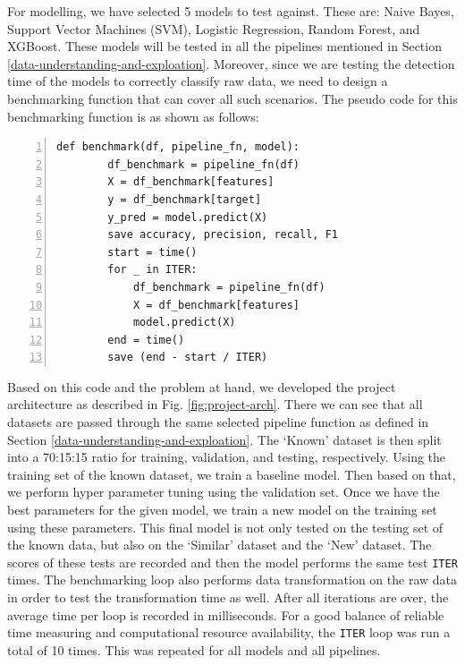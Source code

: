 For modelling, we have selected 5 models to test against. These are: Naive Bayes, Support Vector Machines (SVM), Logistic Regression, Random Forest, and XGBoost. These models will be tested in all the pipelines mentioned in Section \ref{data-understanding-and-exploation}. Moreover, since we are testing the detection time of the models to correctly classify raw data, we need to design a benchmarking function that can cover all such scenarios. The pseudo code for this benchmarking function is as shown as follows:

\begin{lstlisting}[numbers=left,numbersep=-2em,frame=lines]
    def benchmark(df, pipeline_fn, model):
        df_benchmark = pipeline_fn(df)
        X = df_benchmark[features]
        y = df_benchmark[target]
        y_pred = model.predict(X)
        save accuracy, precision, recall, F1
        start = time()
        for _ in ITER:
            df_benchmark = pipeline_fn(df)
            X = df_benchmark[features]
            model.predict(X)
        end = time()
        save (end - start / ITER)
\end{lstlisting}

Based on this code and the problem at hand, we developed the project architecture as described in Fig. \ref{fig:project-arch}. There we can see that all datasets are passed through the same selected pipeline function as defined in Section \ref{data-understanding-and-exploation}. The `Known' dataset is then split into a 70:15:15 ratio for training, validation, and testing, respectively. Using the training set of the known dataset, we train a baseline model. Then based on that, we perform hyper parameter tuning using the validation set. Once we have the best parameters for the given model, we train a new model on the training set using these parameters. This final model is not only tested on the testing set of the known data, but also on the `Similar' dataset and the `New' dataset. The scores of these tests are recorded and then the model performs the same test \lstinline{ITER} times. The benchmarking loop also performs data transformation on the raw data in order to test the transformation time as well. After all iterations are over, the average time per loop is recorded in milliseconds. For a good balance of reliable time measuring and computational resource availability, the \lstinline{ITER} loop was run a total of 10 times. This was repeated for all models and all pipelines.

